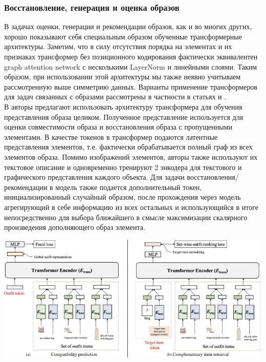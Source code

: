 \documentclass[a4paper,12pt]{article}
\begin{document}
			\subsubsection{Восстановление, генерация и оценка образов}
				В задачах оценки, генерации и рекомендации образов, как и во многих других, хорошо показывают себя специальным образом обученные трансформерные \cite{https://doi.org/10.48550/arXiv.1706.03762} архитектуры. Заметим, что в силу отсутствия порядка на элементах и их признаках трансформер без позиционного кодирования \cite{https://doi.org/10.48550/arXiv.1706.03762} фактически эквивалентен graph attention network \cite{
				https://doi.org/10.48550/arXiv.1710.10903} с несколькими LayerNorm \cite{
				https://doi.org/10.48550/arXiv.1607.06450} и линейными слоями. Таким образом, при использовании этой архитектуры мы также неявно учитываем рассмотренную выше симметрию данных. 
				Варианты применение трансформеров для задач связанных с образами рассмотрены в частности в статьях \cite{https://doi.org/10.48550/arXiv.2303.02483} и \cite{https://doi.org/10.48550/arXiv.2204.04812}.\\
				
				В \cite{https://doi.org/10.48550/arXiv.2204.04812} авторы предлагают использовать архитектуру трансформера для обучения представления образа целиком. Полученное представление используется для оценки совместимости образа и восстановления образа с пропущенными элементами. В качестве токенов в трансформер подаются латентные представления элементов, т.е. фактически обрабатывается полный граф из всех элементов образа. Помимо изображений элементов, авторы также используют их текстовое описание и одновременно тренируют 2 энкодера для текстового и графического представления каждого объекта. Для задачи восстановления/рекомендации в модель также подается дополнительный токен, инициализированный случайный образом, после прохождения через модель агрегирующий в себе информацию из всех остальных и использующийся в итоге непосредственно для выбора ближайшего в смысле максимизации скалярного произведения дополняющего образ элемента.
				
				\includegraphics[scale = 0.8]{OutfitTransfromer intro.png}
				
\end{document}
